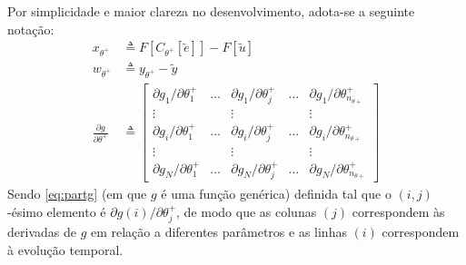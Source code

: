 
Por simplicidade e maior clareza no desenvolvimento, adota-se a seguinte notação:
\begin{align}
   x_{\theta^{+}} &\triangleq F\left[C_{\theta^{+}}[\tilde{e}]\right]-F[\tilde{u}] \label{eq:x} \\
   w_{\theta^{+}} &\triangleq y_{\theta^{+}}-\tilde{y} \label{eq:w} \\
   \frac{\partial g}{\partial \theta^{+}} &\triangleq 
   \begin{bmatrix} 
      \partial g_1/\partial \theta^{+}_1 & \dots & \partial g_1/\partial \theta^{+}_j & \dots & \partial g_1/\partial \theta^{+}_{n_{\theta +}} \\
      \vdots &  & \vdots & & \vdots \\
      \partial g_i/\partial \theta^{+}_1 & \dots & \partial g_i/\partial \theta^{+}_j & \dots & \partial g_i/\partial \theta^{+}_{n_{\theta +}} \\
      \vdots & & \vdots & & \vdots \\
      \partial g_N/\partial \theta^{+}_1 & \dots & \partial g_N/\partial \theta^{+}_j & \dots & \partial g_N/\partial \theta^{+}_{n_{\theta +}}
   \end{bmatrix} \label{eq:partg}
\end{align}
Sendo \eqref{eq:partg} (em que $g$ é uma função genérica) definida tal que o $(i,j)$-ésimo elemento é $\partial g(i)  /\partial \theta^{+}_j$, de modo que as colunas $(j)$ correspondem às derivadas de $g$ em relação a diferentes parâmetros e as linhas $(i)$ correspondem à evolução temporal.


